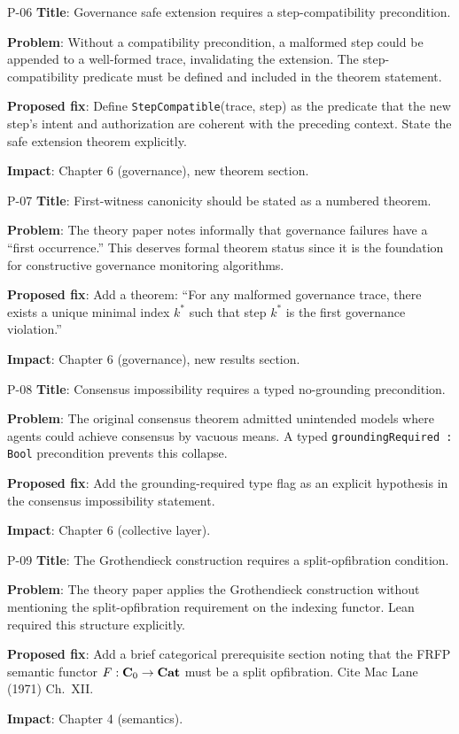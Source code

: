 \begin{proposal}{P-06}
\textbf{Title}: Governance safe extension requires a step-compatibility precondition.

\noindent\textbf{Problem}: Without a compatibility precondition, a malformed step
could be appended to a well-formed trace, invalidating the extension. The
step-compatibility predicate must be defined and included in the theorem statement.

\noindent\textbf{Proposed fix}: Define \texttt{StepCompatible}(trace, step) as
the predicate that the new step's intent and authorization are coherent with the
preceding context. State the safe extension theorem explicitly.

\noindent\textbf{Impact}: Chapter 6 (governance), new theorem section.
\end{proposal}

\begin{proposal}{P-07}
\textbf{Title}: First-witness canonicity should be stated as a numbered theorem.

\noindent\textbf{Problem}: The theory paper notes informally that governance
failures have a ``first occurrence.'' This deserves formal theorem status since
it is the foundation for constructive governance monitoring algorithms.

\noindent\textbf{Proposed fix}: Add a theorem: ``For any malformed governance
trace, there exists a unique minimal index $k^*$ such that step $k^*$ is the
first governance violation.''

\noindent\textbf{Impact}: Chapter 6 (governance), new results section.
\end{proposal}

\begin{proposal}{P-08}
\textbf{Title}: Consensus impossibility requires a typed no-grounding precondition.

\noindent\textbf{Problem}: The original consensus theorem admitted unintended
models where agents could achieve consensus by vacuous means. A typed
\texttt{groundingRequired : Bool} precondition prevents this collapse.

\noindent\textbf{Proposed fix}: Add the grounding-required type flag as an explicit
hypothesis in the consensus impossibility statement.

\noindent\textbf{Impact}: Chapter 6 (collective layer).
\end{proposal}

\begin{proposal}{P-09}
\textbf{Title}: The Grothendieck construction requires a split-opfibration condition.

\noindent\textbf{Problem}: The theory paper applies the Grothendieck construction
without mentioning the split-opfibration requirement on the indexing functor. Lean
required this structure explicitly.

\noindent\textbf{Proposed fix}: Add a brief categorical prerequisite section
noting that the FRFP semantic functor $F : \mathbf{C}_0 \to \mathbf{Cat}$ must be a
split opfibration. Cite Mac Lane (1971) Ch.~XII.

\noindent\textbf{Impact}: Chapter 4 (semantics).
\end{proposal}

